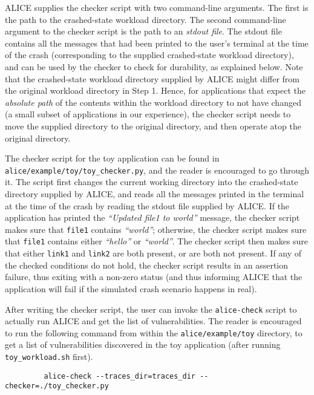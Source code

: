 \documentclass[oneside]{memoir}
\begin{document}
ALICE supplies the checker script with two command-line arguments. The first is the path to the crashed-state workload directory. The second command-line argument to the checker script is the path to an \textit{stdout file}. The stdout file contains all the messages that had been printed to the user's terminal at the time of the crash (corresponding to the supplied crashed-state workload directory), and can be used by the checker to check for durability, as explained below. Note that the crashed-state workload directory supplied by ALICE might differ from the original workload directory in \textmd{Step 1}. Hence, for applications that expect the \textit{absolute path} of the contents within the workload directory to not have changed (a small subset of applications in our experience), the checker script needs to move the supplied directory to the original directory, and then operate atop the original directory. 

The checker script for the toy application can be found in \verb;alice/example/;\discretionary{}{}{}\verb;toy/toy_checker.py;, and the reader is encouraged to go through it. The script first changes the current working directory into the crashed-state directory supplied by ALICE, and reads all the messages printed in the terminal at the time of the crash by reading the stdout file supplied by ALICE. If the application has printed the \textit{``Updated file1 to \emph{world}''} message, the checker script makes sure that \verb;file1; contains \textit{``world''}; otherwise, the checker script makes sure that \verb;file1; contains either \textit{``hello''} or \textit{``world''}. The checker script then makes sure that either \verb;link1; and \verb;link2; are both present, or are both not present. If any of the checked conditions do not hold, the checker script results in an assertion failure, thus exiting with a non-zero status (and thus informing ALICE that the application will fail if the simulated crash scenario happens in real).

After writing the checker script, the user can invoke the \verb;alice-check; script to actually run ALICE and get the list of vulnerabilities. The reader is encouraged to run the following command from within the \verb;alice/example/toy; directory, to get a list of vulnerabilities discovered in the toy application (after running \verb;toy_workload.sh; first).

\begin{verbatim}
         alice-check --traces_dir=traces_dir --checker=./toy_checker.py
\end{verbatim}
\end{document}

